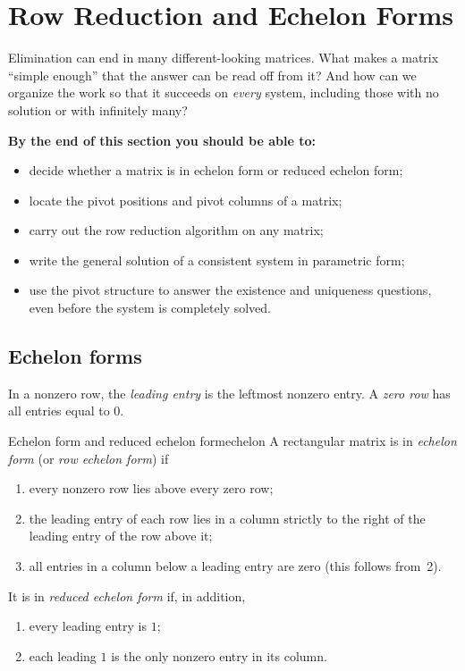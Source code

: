 \documentclass[11pt]{article}
\begin{document}
 
\section{Row Reduction and Echelon Forms}
 
\begin{guide}
Elimination can end in many different-looking matrices. What makes a matrix ``simple enough'' that
the answer can be read off from it? And how can we organize the work so that it succeeds on
\emph{every} system, including those with no solution or with infinitely many?
\end{guide}
 
\textbf{By the end of this section you should be able to:}
\begin{itemize}
  \item decide whether a matrix is in echelon form or reduced echelon form;
  \item locate the pivot positions and pivot columns of a matrix;
  \item carry out the row reduction algorithm on any matrix;
  \item write the general solution of a consistent system in parametric form;
  \item use the pivot structure to answer the existence and uniqueness questions, even before the
        system is completely solved.
\end{itemize}
 
\subsection*{Echelon forms}
 
In a nonzero row, the \emph{leading entry} is the leftmost nonzero entry. A \emph{zero row} has all entries
equal to $0$.
 
\begin{defn}{Echelon form and reduced echelon form}{echelon}
A rectangular matrix is in \emph{echelon form} (or \emph{row echelon form}) if
\begin{enumerate}[itemsep=1pt]
  \item every nonzero row lies above every zero row;
  \item the leading entry of each row lies in a column strictly to the right of the leading entry of
        the row above it;
  \item all entries in a column below a leading entry are zero (this follows from~2).
\end{enumerate}
It is in \emph{reduced echelon form} if, in addition,
\begin{enumerate}[itemsep=1pt,start=4]
  \item every leading entry is $1$;
  \item each leading $1$ is the only nonzero entry in its column.
\end{enumerate}
\end{defn}
 
\end{document}
